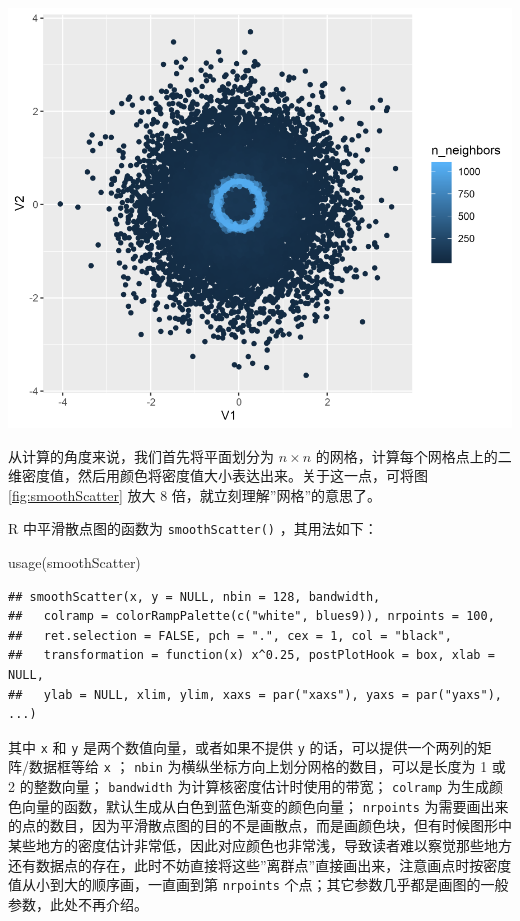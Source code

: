 \documentclass[
  b5paper,
  UTF8,twoside]{book}
\newenvironment{Shaded}{\begin{snugshade}}{\end{snugshade}}
\newcommand{\FunctionTok}[1]{\textcolor[rgb]{0.00,0.00,0.00}{#1}}
\newcommand{\NormalTok}[1]{#1}
\begin{document}
\begin{center}\includegraphics{images/smoothScatter-ggplot} \end{center}

从计算的角度来说，我们首先将平面划分为 \(n\times n\) 的网格，计算每个网格点上的二维密度值，然后用颜色将密度值大小表达出来。关于这一点，可将图 \ref{fig:smoothScatter} 放大 8 倍，就立刻理解''网格''的意思了。

R 中平滑散点图的函数为 \texttt{smoothScatter()} ，其用法如下：

\begin{Shaded}
\begin{Highlighting}[]
\FunctionTok{usage}\NormalTok{(smoothScatter)}
\end{Highlighting}
\end{Shaded}

\begin{verbatim}
## smoothScatter(x, y = NULL, nbin = 128, bandwidth,
##   colramp = colorRampPalette(c("white", blues9)), nrpoints = 100,
##   ret.selection = FALSE, pch = ".", cex = 1, col = "black",
##   transformation = function(x) x^0.25, postPlotHook = box, xlab = NULL,
##   ylab = NULL, xlim, ylim, xaxs = par("xaxs"), yaxs = par("yaxs"), ...)
\end{verbatim}

其中 \texttt{x} 和 \texttt{y} 是两个数值向量，或者如果不提供 \texttt{y} 的话，可以提供一个两列的矩阵/数据框等给 \texttt{x} ； \texttt{nbin} 为横纵坐标方向上划分网格的数目，可以是长度为 1 或 2 的整数向量； \texttt{bandwidth} 为计算核密度估计时使用的带宽； \texttt{colramp} 为生成颜色向量的函数，默认生成从白色到蓝色渐变的颜色向量； \texttt{nrpoints} 为需要画出来的点的数目，因为平滑散点图的目的不是画散点，而是画颜色块，但有时候图形中某些地方的密度估计非常低，因此对应颜色也非常浅，导致读者难以察觉那些地方还有数据点的存在，此时不妨直接将这些''离群点''直接画出来，注意画点时按密度值从小到大的顺序画，一直画到第 \texttt{nrpoints} 个点；其它参数几乎都是画图的一般参数，此处不再介绍。
\end{document}

